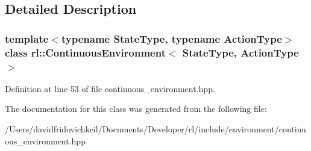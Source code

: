 \subsection{Detailed Description}
\subsubsection*{template$<$typename State\+Type, typename Action\+Type$>$\newline
class rl\+::\+Continuous\+Environment$<$ State\+Type, Action\+Type $>$}



Definition at line 53 of file continuous\+\_\+environment.\+hpp.



The documentation for this class was generated from the following file\+:\begin{DoxyCompactItemize}
\item 
/\+Users/davidfridovichkeil/\+Documents/\+Developer/rl/include/environment/continuous\+\_\+environment.\+hpp\end{DoxyCompactItemize}
